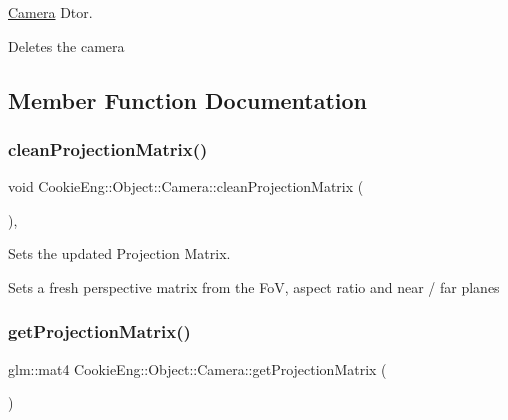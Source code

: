 \hyperlink{class_cookie_eng_1_1_object_1_1_camera}{Camera} Dtor. 

Deletes the camera 

\subsection{Member Function Documentation}
\mbox{\label{class_cookie_eng_1_1_object_1_1_camera_ab685b627f1a3bc019ae68185d41ee38b}} 
\subsubsection{\texorpdfstring{clean\+Projection\+Matrix()}{cleanProjectionMatrix()}}
{\footnotesize\ttfamily void Cookie\+Eng\+::\+Object\+::\+Camera\+::clean\+Projection\+Matrix (\begin{DoxyParamCaption}{ }\end{DoxyParamCaption})\hspace{0.3cm}{\ttfamily [inline]}, {\ttfamily [protected]}}



Sets the updated Projection Matrix. 

Sets a fresh perspective matrix from the FoV, aspect ratio and near / far planes \mbox{\label{class_cookie_eng_1_1_object_1_1_camera_afa69ef269138610423e2dc8707720500}} 
\subsubsection{\texorpdfstring{get\+Projection\+Matrix()}{getProjectionMatrix()}}
{\footnotesize\ttfamily glm\+::mat4 Cookie\+Eng\+::\+Object\+::\+Camera\+::get\+Projection\+Matrix (\begin{DoxyParamCaption}{ }\end{DoxyParamCaption})\hspace{0.3cm}{\ttfamily [inline]}}



